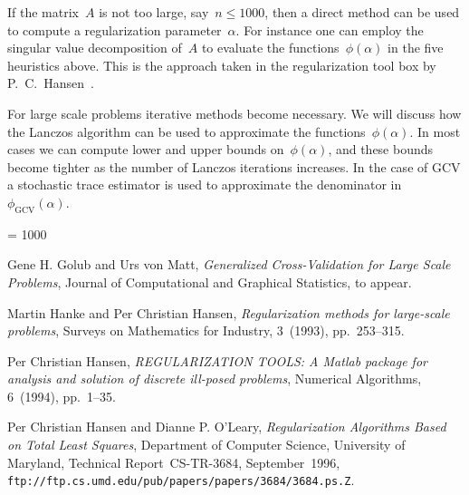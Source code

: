 \documentclass[a4paper,10pt]{amsart}
\begin{document}
If the matrix~$A$ is not too large, say~${n \leq 1000}$,
then a direct method can be used to compute a regularization
parameter~$\alpha$.
For instance one can employ the singular value decomposition of~$A$
to evaluate the functions~${\phi (\alpha)}$ in the five heuristics above.
This is the approach taken in the regularization
tool box by P.~C.~Hansen~\cite{Hansen94}.

For large scale problems iterative methods become necessary.
We will discuss how the Lanczos algorithm can be used to approximate the
functions~${\phi (\alpha)}$.
In most cases we can compute lower and upper bounds on~${\phi (\alpha)}$,
and these bounds become tighter as the number of Lanczos iterations
increases.
In the case of GCV a stochastic trace estimator is used to approximate
the denominator in~${\phi_{\text{GCV}} (\alpha)}$.


{\hyphenpenalty = 1000
\begin{thebibliography}{1}
    {\sc Gene H. Golub and Urs von Matt},
    {\sl Generalized Cross-\negthinspace Validation for Large Scale Problems},
    Journal of Computational and Graphical Statistics, to appear.

    {\sc Martin Hanke and Per Christian Hansen},
    {\sl Regularization methods for large-scale problems},
    Surveys on Mathematics for Industry, 3~(1993), pp.~253--315.

    {\sc Per Christian Hansen},
    {\sl REGULARIZATION TOOLS:
         A Matlab package for analysis and solution of discrete
         ill-posed problems},
    Numerical Algorithms, 6~(1994), pp.~1--35.

    {\sc Per Christian Hansen and Dianne P. O'Leary},
    {\sl Regularization Algorithms Based on Total Least Squares},
    Department of Computer Science, University of Maryland,
    Technical Report~CS-TR-3684, September~1996, \\
    \verb|ftp://ftp.cs.umd.edu/pub/papers/papers/3684/3684.ps.Z|.

\end{thebibliography}}
\end{document}
